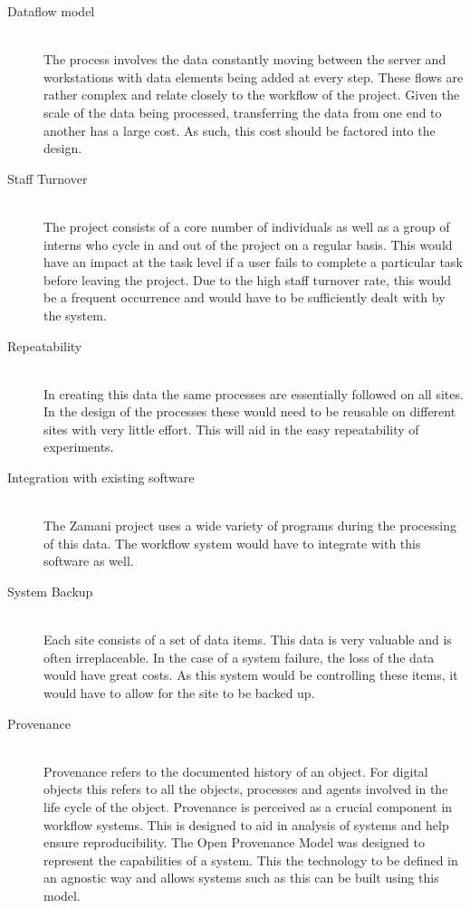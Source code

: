 \begin{description}
    \item[Dataflow model] \hfill \\
        The process involves the data constantly moving between the server
        and workstations with data elements being added at every step. These
        flows are rather complex and relate closely to the workflow of the
        project.  Given the scale of the data being processed, transferring the data
        from one end to another has a large cost. As such, this cost should
        be factored into the design.


    \item[Staff Turnover] \hfill \\
        The project consists of a core number of individuals as well as
        a group of interns who cycle in and out of the project on a regular
        basis. This would have an impact at the task
        level if a user fails to complete a particular task before leaving
        the project. Due to the high staff turnover rate, this would
        be a frequent occurrence and would have to be sufficiently
        dealt with by the system.

    \item[Repeatability] \hfill \\
        In creating this data the same processes are essentially followed
        on all sites. In the design of the processes these would need to
        be reusable on different sites with very little effort. This
        will aid in the easy repeatability of experiments.

    \item[Integration with existing software] \hfill \\
        The Zamani project uses a wide variety of programs during
        the processing of this data. The workflow system would have
	to integrate with this software as well.

    \item[System Backup] \hfill \\
        Each site consists of a set of data items. This data is very valuable
        and is often irreplaceable. In the case of a system failure,
        the loss of the data would have great costs. As this system would
        be controlling these items, it would have to allow for the site
        to be backed up.

    \item[Provenance] \hfill \\
        Provenance refers to the documented history of an object\cite{moreau2008open}. For
        digital objects this refers to all the objects, processes and agents
        involved in the life cycle of the object. Provenance is perceived as
        a crucial component in workflow systems. This is designed to aid in
        analysis of systems and help ensure reproducibility. The Open
        Provenance Model was designed to represent the capabilities of a system.
        This the technology to be defined in an agnostic way and
        allows systems such as this can be built using this model.


\end{description}
